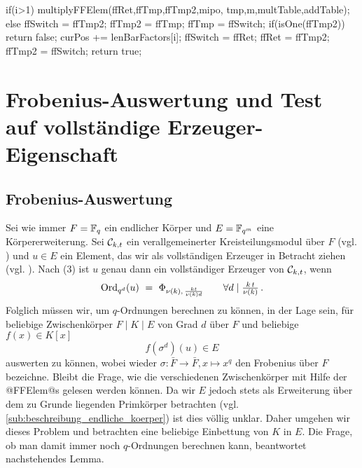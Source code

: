 \begin{ccode}[caption={Aus \url{../Sage/enumeratePCNs.c}},
  firstnumber=666, label=lst:isPrimitive]
{{        if(i>1){
            multiplyFFElem(ffRet,ffTmp,ffTmp2,mipo,
                    tmp,m,multTable,addTable);
        }else{
            ffSwitch = ffTmp2; ffTmp2 = ffTmp; ffTmp = ffSwitch;
        }
        if(isOne(ffTmp2)) return false;
        curPos += lenBarFactors[i];
        ffSwitch = ffRet; ffRet = ffTmp2; ffTmp2 = ffSwitch;
    }
    return true;
}
\end{ccode}

\section{Frobenius-Auswertung und Test auf vollständige
  Erzeuger-Eigenschaft}

\subsection{Frobenius-Auswertung}

Sei wie immer $F = \mathbb{F}_q$ ein endlicher Körper und $E = \mathbb{F}_{q^m}$ eine
Körpererweiterung. Sei $\mathcal{C}_{k,t}$ ein verallgemeinerter
Kreisteilungsmodul über $F$ (vgl.
) und 
$u\in E$ ein Element, das wir als vollständigen Erzeuger 
in Betracht ziehen (vgl. ). Nach 
 (3) ist $u$ genau dann ein vollständiger 
Erzeuger von $\mathcal{C}_{k,t}$, wenn
\[ \operatorname{Ord}_{q^d}(u) \ =\  \Phi_{\nu(k),\, \frac{kt}{\nu(k)d}} \qquad
  \forall d \mid \tfrac{k\,t}{\nu(k)}\,.\]
Folglich müssen wir, um $q$-Ordnungen berechnen zu können, in der Lage sein,
für beliebige Zwischenkörper $F\mid K\mid E$ von Grad $d$ über $F$ und beliebige 
$f(x) \in K[x]$ 
\[ f(\sigma^d)(u) \in E\]
auswerten zu können, wobei wieder $\sigma: \bar F\to \bar F, x \mapsto x^q$ den
Frobenius über $F$ bezeichne. Bleibt die Frage, wie die verschiedenen
Zwischenkörper mit Hilfe der @FFElem@s gelesen werden können. Da wir $E$ jedoch
stets als Erweiterung über dem zu Grunde liegenden Primkörper betrachten 
(vgl. \autoref{sub:beschreibung_endliche_koerper}) ist dies völlig unklar.
Daher umgehen wir dieses Problem und betrachten eine beliebige Einbettung von
$K$ in $E$. Die Frage, ob man damit immer noch $q$-Ordnungen berechnen kann,
beantwortet nachstehendes Lemma.

